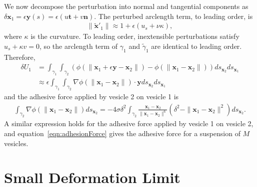 \documentclass[%
preprint,
 amsmath,amssymb,
 aps,
]{revtex4-1}
\newcommand{\nn}{\mathbf{n}}
\renewcommand{\tt}{\mathbf{t}}
\newcommand{\xx}{\mathbf{x}}
\newcommand{\yy}{\mathbf{y}}
\begin{document}
\begin{appendices}
We now decompose the perturbation into normal and tangential components
as $\delta \xx_1 = \epsilon \yy(s) = \epsilon(u\tt + v\nn)$. The
perturbed arclength term, to leading order, is
\begin{align*}
  \|\tilde{\xx}'_1\| \approx 1 + \epsilon(u_s + \nu\kappa),
\end{align*}
where $\kappa$ is the curvature.  To leading order, inextensible
perturbations satisfy $u_s + \kappa v = 0$, so the arclength term of
$\gamma_1$ and $\tilde{\gamma}_1$ are identical to leading order.
Therefore,
\begin{align*}
  \delta U_1 &= \int_{\gamma_1} \int_{\gamma_2} \left(
  \phi(\|\xx_1 + \epsilon \yy  - \xx_2\|) - \phi(\|\xx_1 - \xx_2\|)
  \right) ds_{\xx_2} ds_{\xx_1} \\
  &\approx \epsilon \int_{\gamma_1} \int_{\gamma_2}
  \nabla \phi (\|\xx_1 - \xx_2\|) \cdot \yy ds_{\xx_2} ds_{\xx_1}
\end{align*}
and the adhesive force applied by vesicle 2 on vesicle 1 is
\begin{align*}
  \int_{\gamma_2}\nabla \phi(\|\xx_1 - \xx_2\|)ds_{\xx_2} = 
  -4 \sigma \delta^2 \int_{\gamma_2}
  \frac{\xx_1 - \xx_2}{\|\xx_1 - \xx_2\|^6} 
  \left(\delta^2 - \|\xx_1 - \xx_2\|^2 \right) ds_{\xx_2}.
\end{align*}
A similar expression holds for the adhesive force applied by vesicle 1
on vesicle 2, and equation~\eqref{eqn:adhesionForce} gives the adhesive
force for a suspension of $M$ vesicles.

\section{Small Deformation Limit}
\label{sec:appendixB}




\end{appendices}
\end{document}
